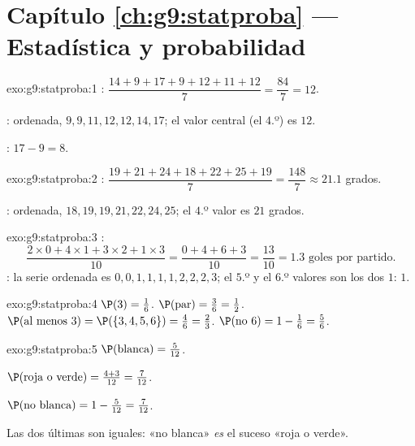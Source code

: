 \section*{Capítulo \ref{ch:g9:statproba} --- Estadística y probabilidad}

\begin{solution}{exo:g9:statproba:1}
: $\dfrac{14 + 9 + 17 + 9 + 12 + 11 + 12}{7} = \dfrac{84}{7} = 12$.

: ordenada, $9, 9, 11, 12, 12, 14, 17$; el valor central (el $4$.º) es
$12$.

: $17 - 9 = 8$.
\end{solution}

\begin{solution}{exo:g9:statproba:2}
: $\dfrac{19 + 21 + 24 + 18 + 22 + 25 + 19}{7} = \dfrac{148}{7}
\approx 21.1$ grados.

: ordenada, $18, 19, 19, 21, 22, 24, 25$; el $4$.º valor es $21$
grados.
\end{solution}

\begin{solution}{exo:g9:statproba:3}
:
\[
\frac{2 \times 0 + 4 \times 1 + 3 \times 2 + 1 \times 3}{10}
= \frac{0 + 4 + 6 + 3}{10} = \frac{13}{10} = 1.3
\text{ goles por partido.}
\]
: la serie ordenada es $0,0,1,1,1,1,2,2,2,3$; el $5$.º y el $6$.º
valores son los dos $1$:  $1$.
\end{solution}

\begin{solution}{exo:g9:statproba:4}
$\P(3) = \frac16$. \quad
$\P(\text{par}) = \frac36 = \frac12$. \quad
$\P(\text{al menos } 3) = \P(\{3,4,5,6\}) = \frac46 = \frac23$. \quad
$\P(\text{no } 6) = 1 - \frac16 = \frac56$.
\end{solution}

\begin{solution}{exo:g9:statproba:5}
$\P(\text{blanca}) = \frac{5}{12}$.

$\P(\text{roja o verde}) = \frac{4 + 3}{12} = \frac{7}{12}$.

$\P(\text{no blanca}) = 1 - \frac{5}{12} = \frac{7}{12}$.

Las dos últimas son iguales: «no blanca» \emph{es} el suceso «roja o
verde».
\end{solution}

